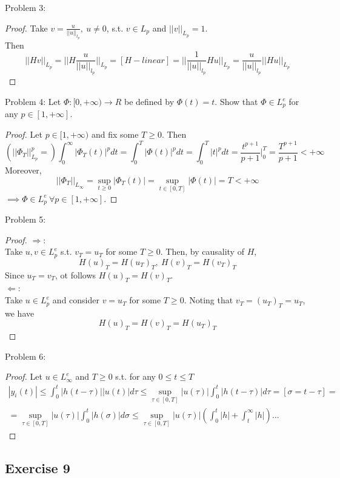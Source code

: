 Problem 3:
\begin{proof}
    Take $v=\frac{u}{||u||_{l_p}}, \ u \neq 0$, s.t. $v \in L_p$ and $||v||_{L_p}=1$.\\
    Then
    $$||Hv||_{L_p}=||H\frac{u}{||u||_{l_p}}||_{L_p}=[H - linear]=||\frac{1}{||u||_{l_p}}Hu||_{L_p}=\frac{u}{||u||_{l_p}}||Hu||_{L_p}$$
\end{proof}

Problem 4:
Let $\Phi:[0,+\infty) \rightarrow R$ be defined by $\Phi(t)=t$. Show that $\Phi \in L^e_p$ for any $p \in [1, +\infty]$.
\begin{proof}
    Let $p \in [1, +\infty)$ and fix some $T \ge 0$. Then
    $$(||\Phi_T||^p_{L_p}=)\int^{\infty}_0|\Phi_T(t)|^pdt = \int^T_0|\Phi(t)|^pdt = \int^T_0|t|^pdt = \frac{t^{p+1}}{p+1}|^T_0 = \frac{T^{p+1}}{p+1} < +\infty$$
    Moreover, 
    $$||\Phi_T||_{L_{\infty}}=\sup_{t \ge 0} |\Phi_T(t)|=\sup_{t \in [0,T]} |\Phi(t)|=T < +\infty$$
    $\implies \Phi \in L^e_p \ \forall p \in [1,+\infty]$.
\end{proof}

Problem 5:
\begin{proof}
    $\Longrightarrow$: \\
    Take $u,v \in L^e_p$ s.t. $v_T=u_T$ for some $T \ge 0$. Then, by causality of $H$,
    $$H(u)_T = H(u_T)_T, \ H(v)_T = H(v_T)_T$$
    Since $u_T=v_T$, ot follows $H(u)_T = H(v)_T$.\\
    $\Longleftarrow$: \\
    Take $u \in L^e_p$ and consider $v=u_T$ for some $T \ge 0$. Noting that $v_T = (u_T)_T=u_T$, we have
    $$H(u)_T=H(v)_T=H(u_T)_T$$
\end{proof}

Problem 6:
\begin{proof}
    Let $u \in L^e_{\infty}$ and $T \ge 0$ s.t. for any $0 \le t \le T$
    \begin{multline*} 
        |y_i(t)| \le \int_0^t |h(t-\tau)||u(t)|d\tau \le \sup_{\tau \in [0,T]} |u(\tau)| \int^t_0|h(t-\tau)|d\tau = [\sigma = t - \tau]  = \\ = \sup_{\tau \in [0,T]} |u(\tau)| \int^t_0|h(\sigma)|d\sigma \le \sup_{\tau \in [0,T]} |u(\tau)|( \int^t_0|h|+\int^{\infty}_t|h|) \dots
    \end{multline*}
\end{proof}

\subsection{Exercise 9}

